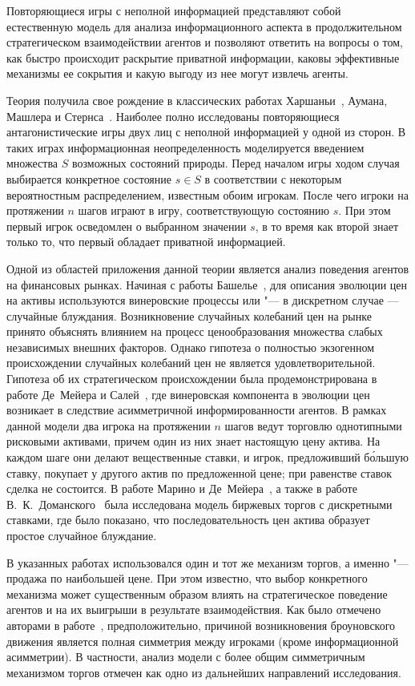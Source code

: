 {\actuality}
Повторяющиеся игры с неполной информацией представляют собой естественную модель для анализа информационного аспекта в продолжительном стратегическом взаимодействии агентов и позволяют ответить на вопросы о том, как быстро происходит раскрытие приватной информации, каковы эффективные механизмы ее сокрытия и какую выгоду из нее могут извлечь агенты.

Теория получила свое рождение в классических работах Харшаньи~\cite{harsanyi67}, Аумана, Машлера и Стернса~\cite{aumann95}. 
Наиболее полно исследованы повторяющиеся антагонистические игры двух лиц с неполной информацией у одной из сторон. 
В таких играх информационная неопределенность моделируется введением множества $S$ возможных состояний природы. 
Перед началом игры ходом случая выбирается конкретное состояние $s \in S$ в соответствии с некоторым вероятностным распределением, известным обоим игрокам.
После чего игроки на протяжении $n$ шагов играют в игру, соответствующую состоянию $s$.
При этом первый игрок осведомлен о выбранном значении $s$, в то время как второй знает только то, что первый обладает приватной информацией.

Одной из областей приложения данной теории является анализ поведения агентов на финансовых рынках.
Начиная с работы Башелье~\cite{bachelier1900}, для описания эволюции цен на активы используются винеровские процессы или "--- в дискретном случае --- случайные блуждания.
Возникновение случайных колебаний цен на рынке принято объяснять влиянием на процесс ценообразования множества слабых независимых внешних факторов. 
Однако гипотеза о полностью экзогенном происхождении случайных колебаний цен не является удовлетворительной. 
Гипотеза об их стратегическом происхождении была продемонстрирована в работе Де~Мейера и Салей~\cite{demeyer02}, где винеровская компонента в эволюции цен возникает в
следствие асимметричной информированности агентов. 
В рамках данной модели два игрока на протяжении $n$ шагов ведут торговлю однотипными рисковыми активами, причем один из них знает настоящую цену актива. 
На каждом шаге они делают вещественные ставки, и игрок, предложивший б\'{о}льшую ставку, покупает у
другого актив по предложенной цене; при равенстве ставок сделка не состоится.
В работе Марино и Де~Мейера~\cite{demeyer05}, а также в работе В.~К.~Доманского~\cite{domansky07} была исследована модель биржевых торгов с дискретными ставками, где было показано, что последовательность цен актива образует простое случайное блуждание.

В указанных работах использовался один и тот же механизм торгов, а именно "--- продажа по наибольшей цене.
При этом известно, что выбор конкретного механизма может существенным образом влиять на стратегическое поведение агентов и на их выигрыши в результате взаимодействия.
Как было отмечено авторами в работе~\cite{demeyer02}, предположительно, причиной возникновения броуновского движения является полная симметрия между игроками (кроме информационной асимметрии).
В частности, анализ модели с более общим симметричным механизмом торгов отмечен как одно из дальнейших направлений исследования.

